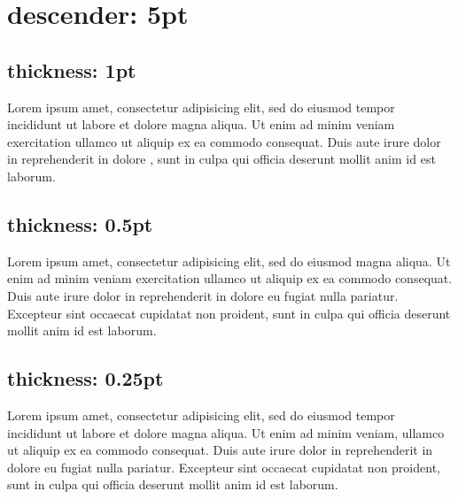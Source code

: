 \documentclass{article}
\begin{document}
\section{descender: 5pt}

\clozedescender{5pt}

\subsection{thickness: 1pt}

\clozelinethickness{1pt}

Lorem ipsum  amet, consectetur adipisicing elit, sed
do eiusmod tempor incididunt ut labore et dolore magna aliqua. Ut enim
ad minim veniam exercitation ullamco  ut aliquip ex
ea commodo consequat. Duis aute irure dolor in reprehenderit in
 dolore , sunt in culpa
qui officia deserunt mollit anim id est laborum.

\subsection{thickness: 0.5pt}

\clozelinethickness{0.5pt}

Lorem ipsum  amet, consectetur adipisicing elit, sed
do eiusmod  magna aliqua.
Ut enim ad minim veniam exercitation ullamco  ut
aliquip ex ea commodo consequat. Duis aute irure dolor in reprehenderit
in  dolore eu fugiat nulla pariatur.
Excepteur sint occaecat cupidatat non proident, sunt in culpa qui
officia deserunt mollit anim id est laborum.

\subsection{thickness: 0.25pt}

\clozelinethickness{0.25pt}

Lorem ipsum  amet, consectetur adipisicing elit, sed
do eiusmod tempor incididunt ut labore et dolore magna aliqua. Ut enim
ad minim veniam, ullamco  ut aliquip
ex ea commodo consequat. Duis aute irure dolor in reprehenderit in
 dolore eu fugiat nulla pariatur.
Excepteur sint occaecat cupidatat non proident, sunt in culpa qui
officia deserunt mollit anim id est laborum.
\end{document}
